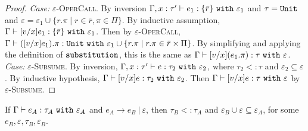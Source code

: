 \documentclass[a4paper,UKenglish]{lipics-v2016}
\begin{document}
\begin{proof}
\textit{Case:} \textsc{$\varepsilon$-OperCall}. By inversion $ \Gamma, x:  \tau' \vdash  e_1: \{ \bar r \}~\mathtt{with}~ \varepsilon_1$ and $\tau = \mathtt{Unit}$ and $\varepsilon = \varepsilon_1 \cup \{ r.\pi \mid r \in \bar r, \pi \in \Pi \}$. By inductive assumption, $ \Gamma \vdash [ v/x] e_1 : \{ \bar r \} ~\mathtt{with}~ \varepsilon_1$. Then by \textsc{$\varepsilon$-OperCall}, $ \Gamma \vdash ([ v/x] e_1).\pi: \mathtt{Unit}~\mathtt{with}~ \varepsilon_1 \cup \{ r.\pi \mid r.\pi \in \bar r \times \Pi \}$. By simplifying and applying the definition of $\mathtt{substitution}$, this is the same as $ \Gamma \vdash [ v/x]( e_1.\pi):  \tau~\mathtt{with}~ \varepsilon$.\\

\textit{Case:} \textsc{$\varepsilon$-Subsume}. By inversion, $ \Gamma, x:  \tau' \vdash  e:  \tau_2~\mathtt{with}~ \varepsilon_2$, where $ \tau_2 <:  \tau$ and $\varepsilon_2 \subseteq \varepsilon$. By inductive hypothesis, $ \Gamma \vdash [ v/x] e:  \tau_2~\mathtt{with}~ \varepsilon_2$. Then $ \Gamma \vdash [ v/x] e:  \tau~\mathtt{with}~ \varepsilon$ by \textsc{$\varepsilon$-Subsume}.

\end{proof}


\hrulefill


\begin{theorem}
If $\Gamma \vdash e_A: \tau_A~\mathtt{with}~ \varepsilon_A$ and $e_A \longrightarrow e_B~|~\varepsilon$, then $\tau_B <: \tau_A$ and $\varepsilon_B \cup \varepsilon \subseteq \varepsilon_A$, for some $e_B, \varepsilon, \tau_B, \varepsilon_B$.
\end{theorem}
\end{document}
